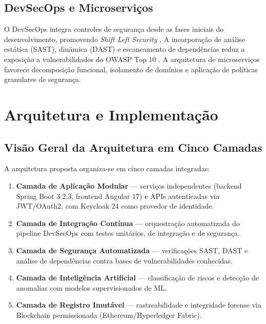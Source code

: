 \documentclass[12pt]{article}
\begin{document}
\subsection{DevSecOps e Microserviços}

O DevSecOps integra controles de segurança desde as fases iniciais do desenvolvimento, promovendo \textit{Shift Left Security} \cite{nist2020}. A incorporação de análise estática (SAST), dinâmica (DAST) e escaneamento de dependências reduz a exposição a vulnerabilidades do OWASP Top 10 \cite{owasp2023}. A arquitetura de microserviços \cite{newman2021} favorece decomposição funcional, isolamento de domínios e aplicação de políticas granulares de segurança.

\section{Arquitetura e Implementação}

\subsection{Visão Geral da Arquitetura em Cinco Camadas}

A arquitetura proposta organiza-se em cinco camadas integradas:

\begin{enumerate}[leftmargin=*]
    \item \textbf{Camada de Aplicação Modular} --- serviços independentes (backend Spring Boot 3.2.3, frontend Angular 17) e APIs autenticadas via JWT/OAuth2, com Keycloak 24 como provedor de identidade.
    \item \textbf{Camada de Integração Contínua} --- orquestração automatizada do pipeline DevSecOps com testes unitários, de integração e de segurança.
    \item \textbf{Camada de Segurança Automatizada} --- verificações SAST, DAST e análise de dependências contra bases de vulnerabilidades conhecidas.
    \item \textbf{Camada de Inteligência Artificial} --- classificação de riscos e detecção de anomalias com modelos supervisionados de ML.
    \item \textbf{Camada de Registro Imutável} --- rastreabilidade e integridade forense via Blockchain permissionada (Ethereum/Hyperledger Fabric).
\end{enumerate}
\end{document}
